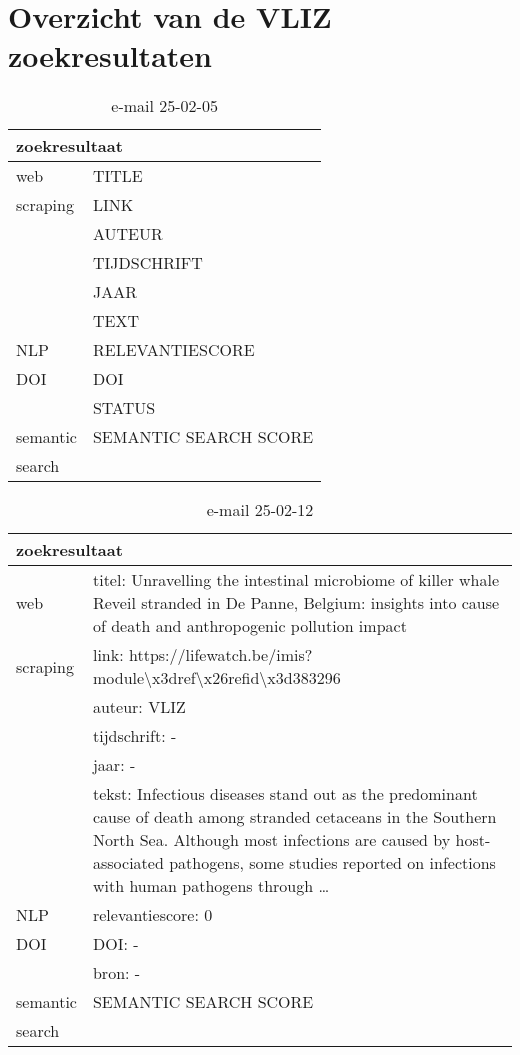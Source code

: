 \section{Overzicht van de VLIZ zoekresultaten}
\begin{table}[h!]
    \caption{e-mail 25-02-05}
    \centering
    \begin{tabularx}{\textwidth}{|p{4cm}|X|} 
        \hline
        \multicolumn{2}{|X|}{\textbf{zoekresultaat}} \\
        \hline
        web &TITLE\\
        scraping&LINK\\
        &AUTEUR\\
        &TIJDSCHRIFT\\
        &JAAR\\
        &TEXT\\
        \hline
        NLP&RELEVANTIESCORE\\
        \hline
        DOI&DOI\\
        &STATUS\\
        \hline
        semantic&SEMANTIC SEARCH SCORE\\
        search&\\
        \hline
    \end{tabularx}
    \label{table:email20250205}
\end{table}
\begin{table}[h!]
    \caption{e-mail 25-02-12}
    \centering
    \begin{tabularx}{\textwidth}{|p{4cm}|X|} 
        \hline
        \multicolumn{2}{|X|}{\textbf{zoekresultaat}} \\
        \hline
        web &titel: Unravelling the intestinal microbiome of killer whale Reveil stranded in De Panne, Belgium: insights into cause of death and anthropogenic pollution impact\\
        scraping&link: https://lifewatch.be/imis?module\textbackslash x3dref\textbackslash x26refid\textbackslash x3d383296\\
        &auteur: VLIZ\\
        &tijdschrift: -\\
        &jaar: -\\
        &tekst: Infectious diseases stand out as the predominant cause of death among stranded cetaceans in the Southern North Sea. Although most infections are caused by host-associated pathogens, some studies reported on infections with human pathogens through …\\
        \hline
        NLP&relevantiescore: 0\\
        \hline
        DOI&DOI: -\\
        &bron: -\\
        \hline
        semantic&SEMANTIC SEARCH SCORE\\
        search&\\
        \hline
    \end{tabularx}
    \label{table:email20250212}
\end{table}
